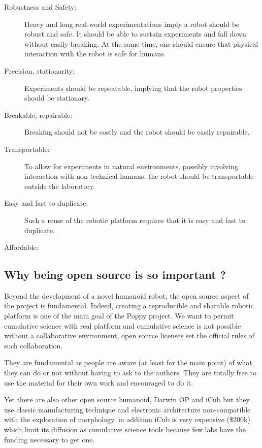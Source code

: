 \begin{description}
    \item[Robustness and Safety:] Heavy and long real-world experimentations imply a robot should be robust and safe. It should be able to sustain experiments and fall down without easily breaking. At the same time, one should ensure that physical interaction with the robot is safe for humans.
    \item [Precision, stationarity:]Experiments should be repeatable, implying that the robot properties should be stationary.
    \item [Breakable, repairable:] Breaking should not be costly and the robot should be easily repairable.
    \item [Transportable:] To allow for experiments in natural environments, possibly involving interaction with non-technical humans, the robot should be transportable outside the laboratory.
    \item [Easy and fast to duplicate:]Such a reuse of the robotic platform requires that it is easy and fast to duplicate.
    \item [Affordable:]
\end{description}


\subsection{Why being open source is so important ?} %

Beyond the development of a novel humanoid robot, the open source aspect of the project is fundamental. Indeed, creating a reproducible and sharable robotic platform is one of the main goal of the Poppy project. We want to permit cumulative science with real platform and cumulative science is not possible without a collaborative environment, open source licenses set the official rules of such collaboration.

They are fundamental as people are aware (at least for the main point) of what they can do or not without having to ask to the authors. They are totally free to use the material for their own work and encouraged to do it.

Yet there are also other open source humanoid, Darwin OP and iCub but they use classic manufacturing technique and electronic architecture non-compatible with the exploration of morphology, in addition iCub is very expensive (\$200k) which limit its diffusion as cumulative science tools because few labs have the funding necessary to get one.

